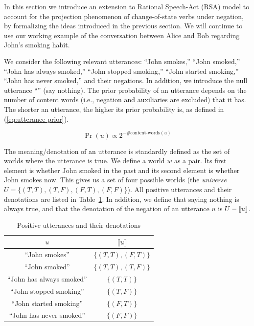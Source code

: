 
In this section we introduce an extension to Rational Speech-Act (RSA) model
\cite{FrankGoodman2012:Predicting-Pragmatic-Reasoning-,GoodmanStuhlmuller2013:Knowledge-and-I} 
to account for the projection phenomenon of change-of-state verbs under negation,
 by formalizing the ideas introduced in the previous section. 
We will continue to use our working example of the conversation between Alice and Bob
 regarding John's smoking habit.

We consider the following relevant utterances: ``John smokes,'' 
 ``John smoked,'' ``John has always smoked,''
 ``John stopped smoking,'' ``John started smoking,'' 
 ``John has never smoked,'' and their negations. 
In addition, we introduce the null utterance ``'' (say nothing).
The prior probability of an utterance depends on the number of content words 
 (i.e., negation and auxiliaries are excluded) that it has.
The shorter an utterance, the higher its prior probability is, as defined in 
 (\ref{eq:utterance-prior}).

\vspace{-6pt}
\begin{equation}
\Pr(u) \propto 2^{-\#\textrm{content-words}(u)}\label{eq:utterance-prior}
\end{equation}

The meaning/denotation of an utterance is standardly defined as the set of worlds 
 where the utterance is true.
We define a world $w$ as a pair.
Its first element is whether John smoked in the past 
 and its second element is whether John smokes now. 
This gives us a set of four possible worlds (the \emph{universe} 
 $U=\{(T, T), (T, F), (F, T), (F, F)\}$).
All positive utterances and their denotations are listed in Table~\ref{tab:pos-utt-denotations}.
In addition, we define that saying nothing is always true, and that the denotation 
 of the negation of an utterance $u$ is $U-\llbracket \text{$u$} \rrbracket$.

\begin{table}
\centering
\begin{tabular}{cc}
$u$ &  $\llbracket \text{$u$} \rrbracket$  \\ \hline
``John smokes''  & $\{(T, T), (F, T)\}$ \\ 
``John smoked'' & $\{(T, T), (T, F)\}$ \\ 
``John has always smoked'' & $\{(T, T)\}$ \\
``John stopped smoking'' & $\{(T, F)\}$ \\
``John started smoking'' & $\{(F, T)\}$ \\
``John has never smoked'' & $\{(F, F)\}$ \\ \hline
\end{tabular}
\vspace{-1ex}
\caption{Positive utterances and their denotations \label{tab:pos-utt-denotations}}
\vspace{-3ex}
\end{table}


